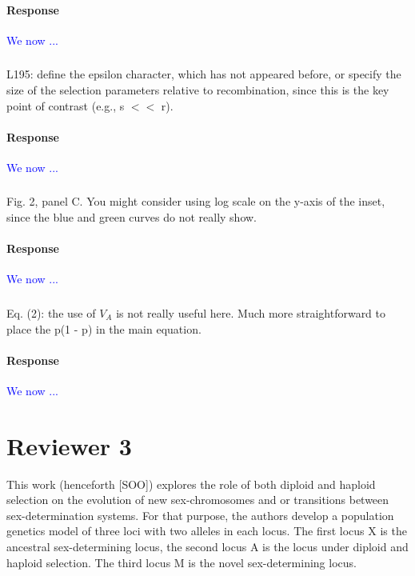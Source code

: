 \documentclass[10pt,letterpaper]{article}
\begin{document}
\noindent\paragraph{Response}
\textcolor{blue}{We now ...}

\noindent\subsubsection{}
L195: define the epsilon character, which has not appeared before, or specify the size of the selection parameters relative to recombination, since this is the key point of contrast (e.g., s $<<$ r).

\noindent\paragraph{Response}
\textcolor{blue}{We now ...}

\noindent\subsubsection{}
Fig. 2, panel C. You might consider using log scale on the y-axis of the inset, since the blue and green curves do not really show.

\noindent\paragraph{Response}
\textcolor{blue}{We now ...}

\noindent\subsubsection{}
Eq. (2): the use of $V_A$ is not really useful here. Much more straightforward to place the p(1 - p) in the main equation.

\noindent\paragraph{Response}
\textcolor{blue}{We now ...}

\section{Reviewer 3}

This work (henceforth [SOO]) explores the role of both diploid and haploid selection on the evolution of new sex-chromosomes and or transitions between sex-determination systems. For that purpose, the authors develop a population genetics model of three loci with two alleles in each locus. The first locus X is the ancestral sex-determining locus, the second locus A is the locus under diploid and haploid selection. The third locus M is the novel sex-determining locus.
\end{document}

